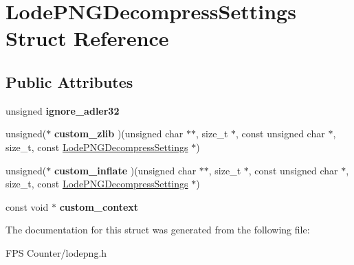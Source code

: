 \hypertarget{struct_lode_p_n_g_decompress_settings}{}\section{Lode\+P\+N\+G\+Decompress\+Settings Struct Reference}
\label{struct_lode_p_n_g_decompress_settings}
\subsection*{Public Attributes}
\begin{DoxyCompactItemize}
\item 
\mbox{\label{struct_lode_p_n_g_decompress_settings_afab4b919650b51b4d2f175a60ed6c580}} 
unsigned {\bfseries ignore\+\_\+adler32}
\item 
\mbox{\label{struct_lode_p_n_g_decompress_settings_a9dd432e46330dbd2ce3ef1929c64337d}} 
unsigned($\ast$ {\bfseries custom\+\_\+zlib} )(unsigned char $\ast$$\ast$, size\+\_\+t $\ast$, const unsigned char $\ast$, size\+\_\+t, const \mbox{\hyperlink{struct_lode_p_n_g_decompress_settings}{Lode\+P\+N\+G\+Decompress\+Settings}} $\ast$)
\item 
\mbox{\label{struct_lode_p_n_g_decompress_settings_a023aa5946c99934d40280850a4d8b204}} 
unsigned($\ast$ {\bfseries custom\+\_\+inflate} )(unsigned char $\ast$$\ast$, size\+\_\+t $\ast$, const unsigned char $\ast$, size\+\_\+t, const \mbox{\hyperlink{struct_lode_p_n_g_decompress_settings}{Lode\+P\+N\+G\+Decompress\+Settings}} $\ast$)
\item 
\mbox{\label{struct_lode_p_n_g_decompress_settings_a66e3608b541c64bb275c0ac1a80c3ec6}} 
const void $\ast$ {\bfseries custom\+\_\+context}
\end{DoxyCompactItemize}


The documentation for this struct was generated from the following file\+:\begin{DoxyCompactItemize}
\item 
F\+P\+S Counter/lodepng.\+h\end{DoxyCompactItemize}
